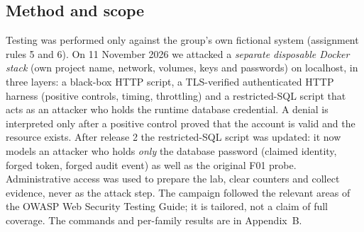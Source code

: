 \documentclass[10pt,a4paper]{article}
\begin{document}
\subsection{Method and scope}
Testing was performed only against the group's own fictional system (assignment rules 5 and 6). On 11 November 2026 we attacked a \emph{separate disposable Docker stack} (own project name, network, volumes, keys and passwords) on localhost, in three layers: a black-box HTTP script, a TLS-verified authenticated HTTP harness (positive controls, timing, throttling) and a restricted-SQL script that acts as an attacker who holds the runtime database credential. A denial is interpreted only after a positive control proved that the account is valid and the resource exists. After release 2 the restricted-SQL script was updated: it now models an attacker who holds \emph{only} the database password (claimed identity, forged token, forged audit event) as well as the original F01 probe. Administrative access was used to prepare the lab, clear counters and collect evidence, never as the attack step. The campaign followed the relevant areas of the OWASP Web Security Testing Guide; it is tailored, not a claim of full coverage. The commands and per-family results are in Appendix~B.
\end{document}
